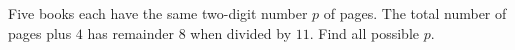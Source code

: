 Five books each have the same two-digit number $p$ of pages. The total number of pages plus $4$ has remainder $8$ when divided by $11$. Find all possible $p$.
